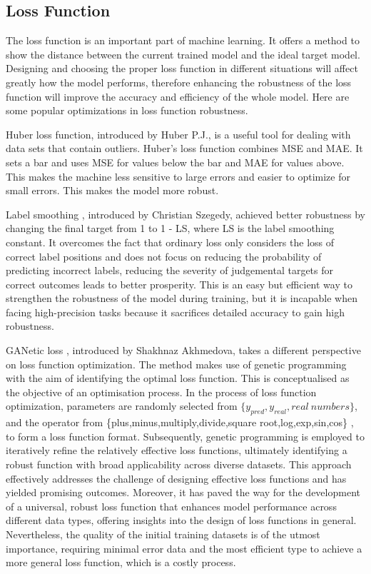 \documentclass{article}
\begin{document}
\subsection{Loss Function}

The loss function is an important part of machine learning. It offers a method to show the distance between the current trained model and the ideal target model. Designing and choosing the proper loss function in different situations will affect greatly how the model performs,  therefore enhancing the robustness of the loss function will improve the accuracy and efficiency of the whole model. Here are some popular optimizations in loss function robustness.

Huber loss function\cite{huber2011robust}, introduced by Huber P.J., is a useful tool for dealing with data sets that contain outliers. Huber's loss function combines MSE and MAE. It sets a bar and uses MSE for values below the bar and MAE for values above. This makes the machine less sensitive to large errors and easier to optimize for small errors. This makes the model more robust. 

Label smoothing \cite{szegedy2015rethinkinginceptionarchitecturecomputer}, introduced by Christian Szegedy, achieved better robustness by changing the final target from 1 to 1 - LS, where LS is the label smoothing constant. It overcomes the fact that ordinary loss only considers the loss of correct label positions and does not focus on reducing the probability of predicting incorrect labels, reducing the severity of judgemental targets for correct outcomes leads to better prosperity. This is an easy but efficient way to strengthen the robustness of the model during training, but it is incapable when facing high-precision tasks because it sacrifices detailed accuracy to gain high robustness.

GANetic loss \cite{akhmedova2024ganeticlossgenerativeadversarial}, introduced by Shakhnaz Akhmedova, takes a different perspective on loss function optimization. The method makes use of genetic programming with the aim of identifying the optimal loss function. This is conceptualised as the objective of an optimisation process. In the process of loss function optimization, parameters are randomly selected from $\{y_{pred}, y_{real}, real\ numbers\}$, and the operator from \{plus,minus,multiply,divide,square root,log,exp,sin,cos\} , to form a loss function format. Subsequently, genetic programming is employed to iteratively refine the relatively effective loss functions, ultimately identifying a robust function with broad applicability across diverse datasets. This approach effectively addresses the challenge of designing effective loss functions and has yielded promising outcomes. Moreover, it has paved the way for the development of a universal, robust loss function that enhances model performance across different data types, offering insights into the design of loss functions in general. Nevertheless, the quality of the initial training datasets is of the utmost importance, requiring minimal error data and the most efficient type to achieve a more general loss function, which is a costly process.
\end{document}
